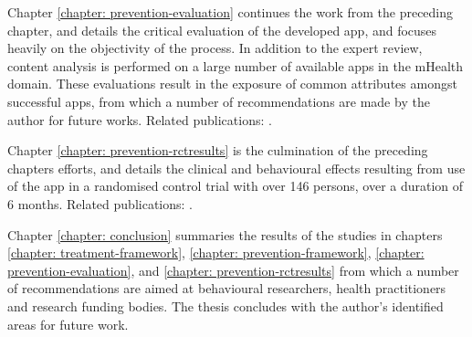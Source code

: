 Chapter \ref{chapter: prevention-evaluation} continues the work from the preceding chapter, and details the  critical evaluation of the developed app, and focuses heavily on the objectivity of the process. In addition to the expert review, content analysis is performed on a large number of available apps in the mHealth domain. These evaluations result in the exposure of common attributes amongst successful apps, from which a number of recommendations are made by the author for future works. 
Related publications: \cite{Hartin2015-JMIR, Hartin2014-IWAAL, Hartin2015-ICOST, Hartin2014-AAIC, Hartin2015-AAIC, Hartin2015-mHealth, Norton2015-TRCI, Norton2015-AAIC, Weyerman2015}.


Chapter \ref{chapter: prevention-rctresults} is the culmination of the preceding chapters efforts, and details the clinical and behavioural effects resulting from use of the app in a randomised control trial with over 146 persons, over a duration of 6 months. 
Related publications: \cite{Hartin2015-JMIR, Hartin2014-IWAAL, Hartin2015-ICOST, Hartin2014-AAIC, Hartin2015-AAIC, Hartin2015-mHealth, Norton2015-TRCI, Norton2015-AAIC, Weyerman2015}.

Chapter \ref{chapter: conclusion} summaries the results of the studies in chapters \ref{chapter: treatment-framework}, \ref{chapter: prevention-framework}, \ref{chapter: prevention-evaluation}, and \ref{chapter: prevention-rctresults} from which a number of recommendations are aimed at behavioural researchers, health practitioners and research funding bodies. The thesis concludes with the author's identified areas for future work.